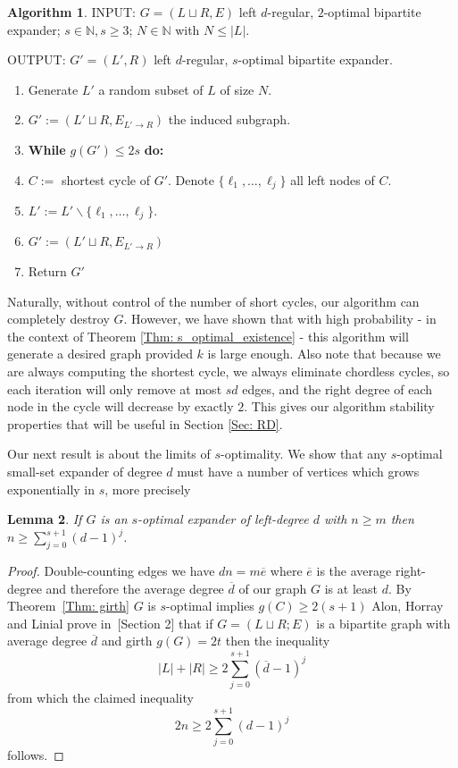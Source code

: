 \documentclass[12pt]{amsart}
\newtheorem{lemma}{Lemma}[section]
\theoremstyle{definition}
\newtheorem{algorithm}[lemma]{Algorithm}
\renewcommand{\geq}{\geqslant}
\renewcommand{\leq}{\leqslant}
\newcommand{\NN}{\ensuremath{\mathbb{N}}}
\newcommand{\1}{\ensuremath{\mathbb{1}}}
\begin{document}
\begin{algorithm}\label{alg: generator}
    INPUT: $G = (L \sqcup R, E)$ left $d$-regular, $2$-optimal bipartite expander; $s \in \NN, s \geq 3$; $N \in \NN$ with $N \leq |L|$. 
    
    OUTPUT: $G'=(L',R)$ left $d$-regular, $s$-optimal bipartite expander.
    \begin{enumerate}
        \item Generate $L'$ a random subset of $L$ of size $N$.
        \item $G':= (L' \sqcup R, E_{L' \rightarrow R})$ the induced subgraph.
        \item \textbf{While} $g(G') \leq 2s$ \textbf{do:}
        \item \quad $C:=$ shortest cycle of $G'$. Denote $\{\ell_1,\hdots,\ell_j\}$ all left nodes of $C$.
        \item \quad $L' := L' \backslash \{\ell_1,\hdots,\ell_j\}$.
        \item \quad $G' := (L' \sqcup R, E_{L' \rightarrow R})$
        \item Return $G'$
    \end{enumerate}
\end{algorithm}

Naturally, without control of the number of short cycles, our algorithm can completely destroy $G$. However, we have shown that with high probability - in the context of Theorem \ref{Thm: s_optimal_existence} - this algorithm will generate a desired graph provided $k$ is large enough. Also note that because we are always computing the shortest cycle, we always eliminate chordless cycles, so each iteration will only remove at most $sd$ edges, and the right degree of each node in the cycle will decrease by exactly $2$. This gives our algorithm stability properties that will be useful in Section \ref{Sec: RD}.

Our next result is about the limits of $s$-optimality. We show that any $s$-optimal small-set expander of degree $d$ must have a number of vertices which grows exponentially in $s$, more precisely

\begin{lemma}\label{lem: exps} If $G$ is an $s$-optimal expander of left-degree $d$ with $n\geq m$ then $n\geq \sum_{j=0}^{s+1}(d-1)^j$.
\end{lemma}
\begin{proof} Double-counting edges we have $dn=m\overline{e}$ where $\overline{e}$ is the average right-degree and therefore the average degree $\overline{d}$ of our graph $G$ is at least $d$. By Theorem~\ref{Thm: girth} $G$ is $s$-optimal implies $g(C)\geq 2(s+1)$
Alon, Horray and Linial prove in~\cite{HooryLinialWigderson06}[Section 2] that if $G=(L\sqcup R;E)$ is a bipartite graph with average degree $\overline{d}$ and girth $g(G)=2t$ then the inequality 
\[|L|+|R|\geq 2\sum_{j=0}^{s+1}(\overline{d}-1)^j\]
from which the claimed inequality 
\[2n \geq 2\sum_{j=0}^{s+1}(d-1)^j\]
follows.
\end{proof}
\end{document}
